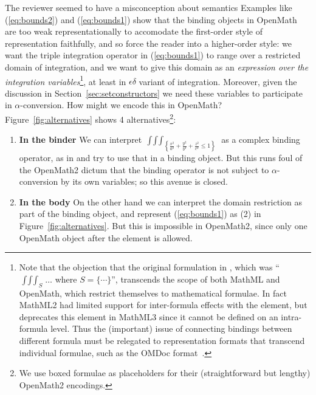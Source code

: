 \documentclass{llncs}
\begin{document}
\begin{newpart}{The reviewer seemed to have a misconception about semantics}
Examples like (\ref{eq:bounds2}) and (\ref{eq:bounds1}) show that the binding objects in
OpenMath are too weak representationally to accomodate the first-order style of
representation faithfully, and so force the reader into a higher-order style: we want the triple
integration operator in (\ref{eq:bounds1}) to range over a restricted domain of
integration, and we want to give this domain as an {\emph{expression over the integration
   variables}}\footnote{Note that the objection that the original formulation in
  \cite{Apostol1967}, which was ``$\mathop{\int\int\int}_S\ldots$ where $S=\{\cdots\}$'',
  transcends the scope of both MathML and OpenMath, which restrict themselves to
  mathematical formulae. In fact MathML2 had limited support for inter-formula effects
  with the {} element, but deprecates this element in MathML3 since it
  cannot be defined on an intra-formula level. Thus the (important) issue of connecting
  bindings between different formula must be relegated to representation formats that
  transcend individual formulae, such as the OMDoc format~\cite{Kohlhase:omdoc1.2}.}, at
least in $\epsilon\delta$ variant of integration. Moreover, given the discussion in
Section~\ref{sec:setconstructors} we need these variables to participate in
$\alpha$-conversion.
How might we encode this in OpenMath? Figure~\ref{fig:alternatives} shows 4
alternatives\footnote{We use boxed formulae as placeholders for their
  (straightforward but lengthy) OpenMath2 encodings.}:
\begin{enumerate}
\item{\textbf{In the binder}}\label{OM:bind} We can interpret
  $\scriptstyle\mathop{\int\int\int}_{\scriptscriptstyle\left\{\frac{x^2}{a^2}+\frac{y^2}{b^2}+\frac{z^2}{c^2}\le1\right\}}$
  as a complex binding operator, as in {} and try to use that in
  a binding object. But this runs foul of the OpenMath2 dictum that the binding operator
  is not subject to $\alpha$-conversion by its own variables; so this avenue is closed.
\item{\textbf{In the body}}\label{OM:multi} On the other hand we can interpret the domain
  restriction as part of the binding object, and represent (\ref{eq:bounds1}) as (2) in
  Figure~\ref{fig:alternatives}. But this is impossible in OpenMath2, since only
  one OpenMath object after the {} element is allowed.

\end{enumerate}
\end{newpart}
\end{document}
